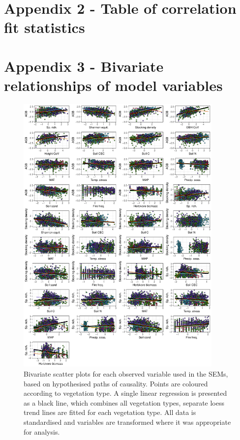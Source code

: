 \documentclass[11pt,a4paper]{article}
\begin{document}
\section{Appendix 2 - Table of correlation fit statistics} \label{appendixb}




\section{Appendix 3 - Bivariate relationships of model variables} \label{appendixc}

\begin{figure}[H]
\centering
	\includegraphics[width=0.9\textwidth]{bivar_lm}
	\caption{Bivariate scatter plots for each observed variable used in the SEMs, based on hypothesised paths of causality. Points are coloured according to vegetation type. A single linear regression is presented as a black line, which combines all vegetation types, separate loess trend lines are fitted for each vegetation type. All data is standardised and variables are transformed where it was appropriate for analysis.}
	\label{bivar_lm}
\end{figure}
\end{document}
